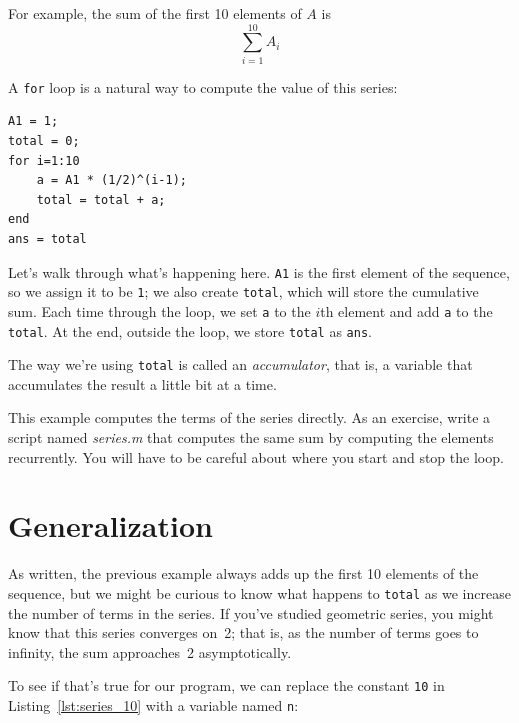 
For example, the sum of the first 10 elements of $A$ is
\begin{equation*}
\sum_{i=1}^{10} A_i
\end{equation*}

A \lstinline{for} loop is a natural way to compute the value of this series:

\begin{lstlisting}[caption={A program that calculates a simple series}, label={lst:series_10}]
A1 = 1;
total = 0;
for i=1:10
    a = A1 * (1/2)^(i-1);
    total = total + a;
end
ans = total
\end{lstlisting}

Let's walk through what's happening here. \lstinline{A1} is the first element of the sequence, so we assign it to be \lstinline{1}; we also create \lstinline{total}, which will store the cumulative sum.
Each time through the loop, we set \lstinline{a} to the $i$th element and add \lstinline{a} to the \lstinline{total}.
At the end, outside the loop, we store  \lstinline{total} as \lstinline{ans}.

The way we're using \lstinline{total} is called an \emph{accumulator}, that is, a variable that accumulates the result a little bit at a time.



\begin{ex}
This example computes the terms of the series directly. As
an exercise, write a script named \emph{series.m} that computes
the same sum by computing the elements recurrently.  You will
have to be careful about where you start and stop the loop.
\end{ex}


\section{Generalization}


As written, the previous example always adds up the first 10
elements of the sequence, but we might be curious to know what
happens to \lstinline{total} as we increase the
number of terms in the series.  If you've studied geometric
series, you might know that this series converges on~2; that is,
as the number of terms goes to infinity, the sum approaches~2 asymptotically.

To see if that's true for our program, we can replace the
constant \lstinline{10} in Listing~\ref{lst:series_10} with a variable named \lstinline{n}:

